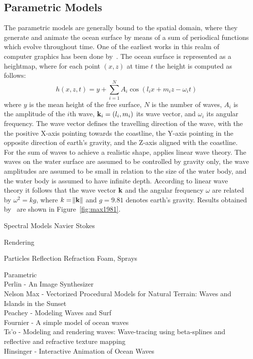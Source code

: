 \subsection{Parametric Models}
%
The parametric models are generally bound to the spatial domain, where they
generate and animate the ocean surface by means of a sum of periodical functions
which evolve throughout time. One of the earliest works in this realm of
computer graphics has been done by~\citet{Max:1981}. The ocean surface is
represented as a heightmap, where for each point $(x,z)$ at time $t$ the height
is computed as follows:
\begin{equation}
h(x,z,t) = y + \sum_{i=1}^N A_i \cos (l_i x + m_i z - \omega_i t)
\end{equation}
where $y$ is the mean height of the free surface, $N$ is the number of waves,
$A_i$ is the amplitude of the $i$th wave, $\mathbf{k}_i = (l_i, m_i)$ its wave
vector, and $\omega_i$ its angular frequency. The wave vector defines the
travelling direction of the wave, with the the positive X-axis pointing towards
the coastline, the Y-axis pointing in the opposite direction of earth's gravity,
and the Z-axis aligned with the coastline. For the sum of waves to achieve a
realistic shape, \citeauthor{Max:1981} applies linear wave theory.
The waves on the water surface are assumed to be controlled by gravity only,
the wave amplitudes are assumed to be small in relation to the size of the water
body, and the water body is assumed to have infinite depth. According to linear
wave theory it follows that the wave vector $\mathbf{k}$ and the angular frequency
$\omega$ are related by $\omega^2=kg$, where $k=\norm{\mathbf{k}}$ and $g=9.81$
denotes earth's gravity. Results obtained by~\citeauthor{Max:1981} are shown in
Figure~\ref{fig:max1981}.


Spectral Models
Navier Stokes

Rendering

Particles
Reflection
Refraction
Foam, Sprays

Parametric\\
Perlin - An Image Synthesizer \cite{Perlin:1985}\\
Nelson Max - Vectorized Procedural Models for Natural Terrain: Waves and Islands in the Sunset \cite{Max:1981}\\
Peachey - Modeling Waves and Surf \cite{Peachey:1986}\\
Fournier - A simple model of ocean waves \cite{Fournier:1986}\\
Ts'o - Modeling and rendering waves: Wave-tracing using beta-splines and reflective and refractive texture mapping \cite{Ts'o:1987}\\Hinsinger - Interactive Animation of Ocean Waves \cite{Hinsinger:2002}\\

